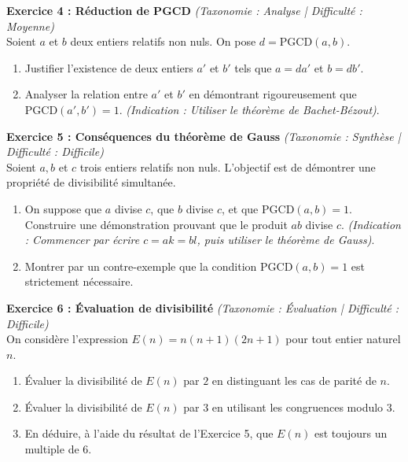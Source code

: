 \vspace{0.5cm}

\noindent\textbf{Exercice 4 : Réduction de PGCD} \textit{(Taxonomie : Analyse | Difficulté : Moyenne)} \\
Soient $a$ et $b$ deux entiers relatifs non nuls. On pose $d = \text{PGCD}(a, b)$.
\begin{enumerate}
    \item Justifier l'existence de deux entiers $a'$ et $b'$ tels que $a = da'$ et $b = db'$.
    \item Analyser la relation entre $a'$ et $b'$ en démontrant rigoureusement que $\text{PGCD}(a', b') = 1$. \textit{(Indication : Utiliser le théorème de Bachet-Bézout)}.
\end{enumerate}

\vspace{0.5cm}

\noindent\textbf{Exercice 5 : Conséquences du théorème de Gauss} \textit{(Taxonomie : Synthèse | Difficulté : Difficile)} \\
Soient $a, b$ et $c$ trois entiers relatifs non nuls. L'objectif est de démontrer une propriété de divisibilité simultanée.
\begin{enumerate}
    \item On suppose que $a$ divise $c$, que $b$ divise $c$, et que $\text{PGCD}(a, b) = 1$. Construire une démonstration prouvant que le produit $ab$ divise $c$. \textit{(Indication : Commencer par écrire $c = ak = bl$, puis utiliser le théorème de Gauss)}.
    \item Montrer par un contre-exemple que la condition $\text{PGCD}(a, b) = 1$ est strictement nécessaire.
\end{enumerate}

\vspace{0.5cm}

\noindent\textbf{Exercice 6 : Évaluation de divisibilité} \textit{(Taxonomie : Évaluation | Difficulté : Difficile)} \\
On considère l'expression $E(n) = n(n+1)(2n+1)$ pour tout entier naturel $n$.
\begin{enumerate}
    \item Évaluer la divisibilité de $E(n)$ par $2$ en distinguant les cas de parité de $n$.
    \item Évaluer la divisibilité de $E(n)$ par $3$ en utilisant les congruences modulo $3$.
    \item En déduire, à l'aide du résultat de l'Exercice 5, que $E(n)$ est toujours un multiple de $6$.
\end{enumerate}

